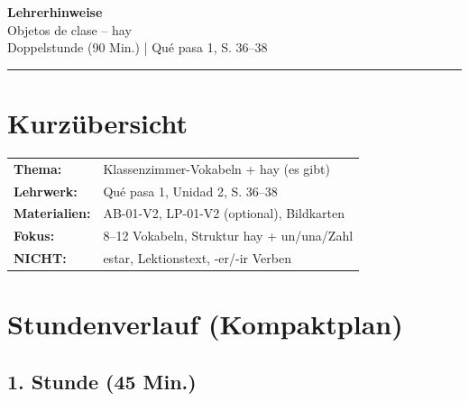\documentclass[11pt,a4paper]{article}
\begin{document}
\begin{center}
{\Large\textcolor{fach}{\textbf{Lehrerhinweise}}}\\[0.3cm]
{\large Objetos de clase -- hay}\\[0.2cm]
{\normalsize Doppelstunde (90 Min.) | Qué pasa 1, S. 36--38}
\end{center}

\vspace{0.5cm}
\hrule
\vspace{0.5cm}

\section*{Kurzübersicht}

\begin{tabular}{ll}
\textbf{Thema:} & Klassenzimmer-Vokabeln + hay (es gibt) \\
\textbf{Lehrwerk:} & Qué pasa 1, Unidad 2, S. 36--38 \\
\textbf{Materialien:} & AB-01-V2, LP-01-V2 (optional), Bildkarten \\
\textbf{Fokus:} & 8--12 Vokabeln, Struktur hay + un/una/Zahl \\
\textbf{NICHT:} & estar, Lektionstext, -er/-ir Verben \\
\end{tabular}

\vspace{0.5cm}

\section*{Stundenverlauf (Kompaktplan)}

\subsection*{1. Stunde (45 Min.)}
\end{document}
